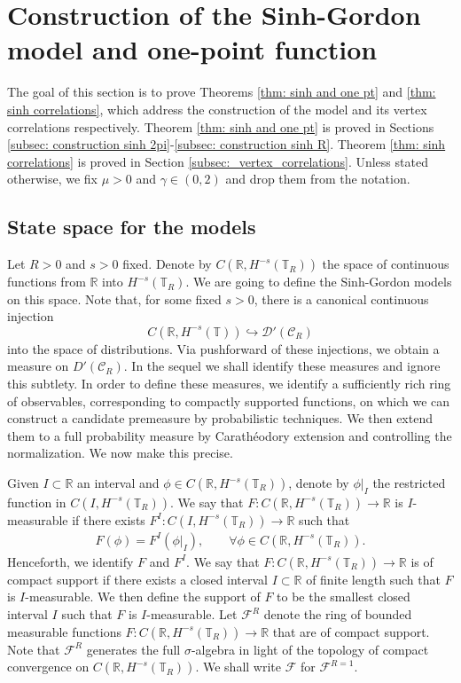 \documentclass[11pt]{amsart}
\numberwithin{equation}{section}
\theoremstyle{definition}
\newcommand{\mc}{\mathcal}
\def\T{\mathbb{T}}
\begin{document}
\section{Construction of the Sinh-Gordon model and one-point function} \label{sec: path integral}

The goal of this section is to prove Theorems \ref{thm: sinh and one pt} and \ref{thm: sinh correlations}, which address the construction of the model and its vertex correlations respectively. 
Theorem \ref{thm: sinh and one pt} is proved in Sections \ref{subsec: construction sinh 2pi}-\ref{subsec: construction sinh R}. Theorem \ref{thm: sinh correlations} is proved in Section \ref{subsec:_vertex_correlations}. Unless stated otherwise, we fix $\mu > 0$ and $\gamma \in (0,2)$ and drop them from the notation.

\subsection{State space for the models} \label{subsec: state space}

Let $R>0$ and $s>0$ fixed. Denote by $C(\mathbb{R}, H^{-s}(\T_R))$ the space of continuous functions from $\mathbb{R}$ into $H^{-s}(\T_R)$. We are going to define the Sinh-Gordon models on this space. 
Note that, for some fixed $s>0$, there is a canonical continuous injection
\[
C(\mathbb{R}, H^{-s}(\mathbb{T})) \hookrightarrow \mc{D}'(\mathcal{C}_R)
\]
into the space of distributions. Via pushforward of these injections, we obtain a measure on $D'(\mathcal{C}_R)$. In the sequel we shall identify these measures and ignore this subtlety. In order to define these measures, we identify a sufficiently rich ring of observables, corresponding to compactly supported functions, on which we can construct a candidate premeasure by probabilistic techniques. We then extend them to a full probability measure by Carath\'eodory extension and controlling the normalization. We now make this precise. 

Given $I \subset \mathbb{R}$ an interval and $\phi \in C(\mathbb{R}, H^{-s}(\T_R))$, denote by $\phi|_I$ the restricted function in $C(I, H^{-s}(\T_R))$. 
We say that $F:C(\mathbb{R}, H^{-s}(\T_R)) \rightarrow \mathbb{R}$ is $I$-measurable if there exists 
$F^I : C(I, H^{-s}(\T_R)) \rightarrow \mathbb{R}$ such that
\begin{align*}
F(\phi) 
= 
F^I(\phi|_I), \qquad \forall 	\phi \in C(\mathbb{R}, H^{-s}(\T_R)).
\end{align*} 
Henceforth, we identify $F$ and $F^I$. We say that $F:C(\mathbb{R}, H^{-s}(\T_R)) \rightarrow \mathbb{R}$ is of compact support if there exists a closed interval $I \subset\mathbb{R}$ of finite length such that $F$ is $I$-measurable. We then define the support of $F$ to be the smallest closed interval $I$ such that $F$ is $I$-measurable. Let $\mathcal{F}^R$ denote the ring of bounded measurable functions $F:C(\mathbb{R},H^{-s}(\T_R))\rightarrow \mathbb{R}$ that are of compact support. Note that $\mathcal{F}^R$ generates the full $\sigma$-algebra in light of the topology of compact convergence on $C(\mathbb{R},H^{-s}(\T_R))$. We shall write $\mc{F}$ for $\mc{F}^{R=1}$.
\end{document}
